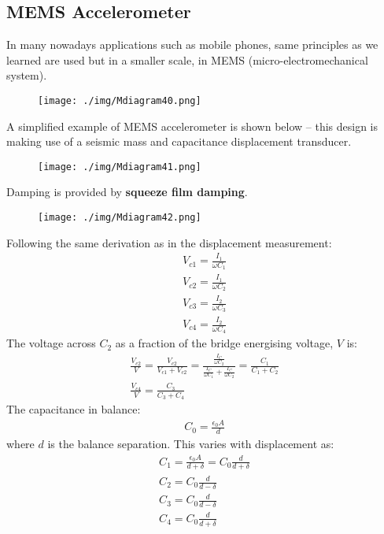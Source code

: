 \subsection{MEMS Accelerometer}
In many nowadays applications such as mobile phones, same principles as we learned are used but in a smaller scale, in MEMS (micro-electromechanical system).
\begin{figure}[H]
  \centering
  \texttt{[image: ./img/Mdiagram40.png]}
\end{figure}
A simplified example of MEMS accelerometer is shown below – this design is making use of a seismic mass and capacitance displacement transducer.
\begin{figure}[H]
  \centering
  \texttt{[image: ./img/Mdiagram41.png]}
\end{figure}
Damping is provided by \textbf{squeeze film damping}.
\begin{figure}[H]
  \centering
  \texttt{[image: ./img/Mdiagram42.png]}
\end{figure}
Following the same derivation as in the displacement measurement:
\begin{gather}
  V_{c1} = \frac{I_1}{\omega C_1} \\
  V_{c2} = \frac{I_1}{\omega C_2} \\
  V_{c3} = \frac{I_2}{\omega C_3} \\
  V_{c4} = \frac{I_2}{\omega C_4}
\end{gather}
The voltage across $C_2$ as a fraction of the bridge energising voltage, $V$ is:
\begin{gather}
  \frac{V_{c2}}{V} = \frac{V_{c2}}{V_{c1}+V_{c2}} = \frac{\frac{I_C}{\omega C_2}}{\frac{I_C}{\omega C_1}+\frac{I_C}{\omega C_2}} = \frac{C_1}{C_1+C_2} \\[10pt]
  \frac{V_{c4}}{V} = \frac{C_3}{C_3+C_4}
\end{gather}
The capacitance in balance:
\begin{gather}
  C_0 = \frac{\epsilon_0 A}{d}
\end{gather}
where $d$ is the balance separation. This varies with displacement as:
\begin{gather}
  C_1 = \frac{\epsilon_0 A}{d+\delta} = C_0\frac{d}{d+\delta} \\
  C_2 = C_0\frac{d}{d-\delta} \\
  C_3 = C_0\frac{d}{d-\delta} \\
  C_4 = C_0\frac{d}{d+\delta}
\end{gather}
